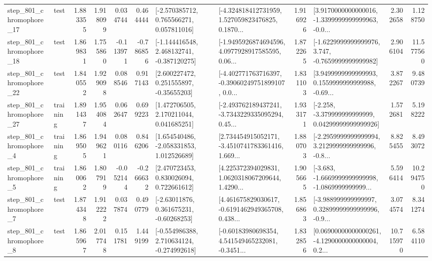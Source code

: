 \begin{tabular}{llrrrrllrlrr}
  step\_801\_chromophore\_17 &      test &      1.883355 &    1.918099 &      0.034744 &  0.464444 &    [-2.570385712, 0.765566271, 0.057811016] &  [-4.324818412731959, 1.527059823476825, 0.1870... &       1.916926 &  [3.9170000000000016, -1.3399999999999963, -0.0... &            2.302658 &          1.128750 \\
  step\_801\_chromophore\_18 &      test &      1.869831 &    1.755860 &     -0.113971 & -0.786856 &   [-1.144416548, 2.468132741, -0.387120275] &  [-1.9495926874694596, 4.0977928917585595, 0.06... &       1.872265 &  [-1.6229999999999976, 3.747, -0.7659999999999982] &            2.906104 &         11.577560 \\
  step\_801\_chromophore\_22 &      test &      1.840552 &    1.929098 &      0.088546 &  0.917143 &     [2.600227472, 0.251555897, -0.35655203] &  [-4.402771763716397, -0.39060249751899107, 0.0... &       1.831103 &  [3.9499999999999993, 0.1559999999999988, -0.69... &            3.872267 &          9.480739 \\
  step\_801\_chromophore\_27 &  training &      1.891437 &    1.954084 &      0.062647 &  0.699223 &     [1.472706505, 2.170211044, 0.041685251] &  [-2.493762189437241, -3.7343229335095294, 0.45... &       1.933171 &  [-2.258, -3.379999999999999, 0.04299999999999926] &            1.572681 &          5.198222 \\
   step\_801\_chromophore\_4 &  training &      1.869505 &    1.949621 &      0.080116 &  0.846206 &    [1.654540486, -2.058331853, 1.012526689] &  [2.734454915052171, -3.4510741783361416, 1.669... &       1.880703 &  [-2.2959999999999994, 3.2129999999999996, -0.8... &            8.825455 &          8.493072 \\
   step\_801\_chromophore\_5 &  training &      1.860062 &    1.807919 &     -0.052144 & -0.266632 &     [2.470723453, 0.830026094, 0.722661612] &  [4.225372394029831, 1.0620318067209644, 1.4290... &       1.905665 &  [-3.683, -1.6669999999999998, -1.0869999999999... &            5.596414 &         10.294750 \\
   step\_801\_chromophore\_7 &      test &      1.874348 &    1.912222 &      0.037874 &  0.490779 &     [-2.63011876, 0.361675231, -0.60268253] &  [4.461675829030617, -0.6191462949365708, 0.438... &       1.856863 &  [-3.988999999999997, 0.32899999999999996, -0.9... &            3.074574 &          8.341274 \\
   step\_801\_chromophore\_8 &      test &      1.865967 &    2.017748 &      0.151781 &  1.449199 &   [-0.554986388, 2.710634124, -0.274992618] &  [-0.60183980698354, 4.541549465232081, -0.3451... &       1.832856 &  [0.06900000000000261, -4.1290000000000004, 0.2... &           10.715970 &          6.584110 \\

\end{tabular}
